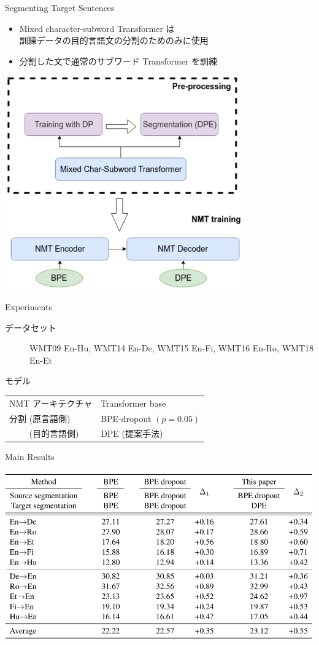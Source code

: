 \documentclass[unicode, 12pt, xdvipdfmx, aspectratio=43]{beamer}
\begin{document}
\begin{frame}[label={sec:org4cab1f0}]{Segmenting Target Sentences}
\begin{itemize}
\item Mixed character-subword Transformer は \\ \alert{訓練データ}の\alert{目的言語文}の分割のためのみに使用
\item 分割した文で通常のサブワード Transformer を訓練
\end{itemize}
\begin{center}
\includegraphics[width=0.5\linewidth]{./figure/Figure3.pdf}
\end{center}
\end{frame}

\begin{frame}[label={sec:orgf40ec73}]{Experiments}
\begin{description}
\item[{データセット}] WMT09 En-Hu, WMT14 En-De, WMT15 En-Fi, WMT16 En-Ro, WMT18 En-Et
\item[{モデル}] 
\end{description}
\begin{center}
\begin{tabular}{ll}
\toprule
NMT アーキテクチャ & Transformer base\\
分割 (原言語側) & BPE-dropout \((p=0.05)\)\\
　　 (目的言語側) & DPE (提案手法)\\
\bottomrule
\end{tabular}
\end{center}
\end{frame}

\begin{frame}[label={sec:org6e5143b}]{Main Results}
\begin{center}
\includegraphics[width=1.05\linewidth]{./figure/Table2.pdf}
\end{center}
\end{frame}
\end{document}
